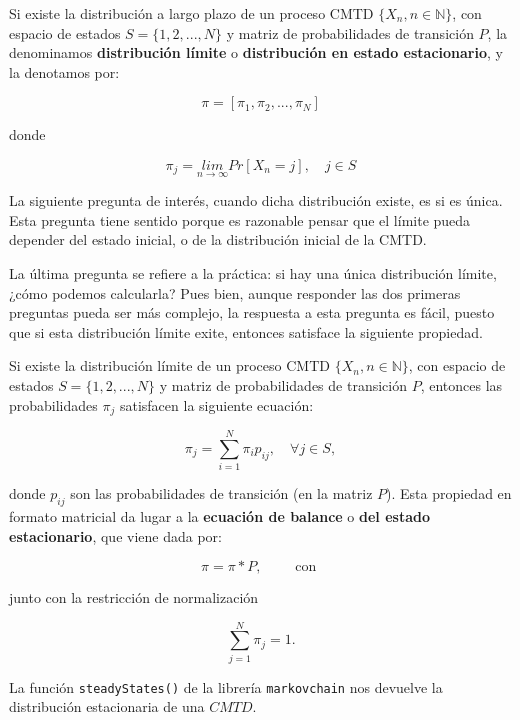 \documentclass[
]{book}
\newenvironment{yellowbox}{
  \definecolor{shadecolor}{rgb}{210, 180, 140}  
  \color{black}
  \begin{shaded}}
 {\end{shaded}}
\newenvironment{whitebox}{
  \definecolor{shadecolor}{rgb}{255, 255, 255}  
  \color{black}
  \begin{shaded}}
 {\end{shaded}}
\theoremstyle{definition}
\theoremstyle{definition}
\theoremstyle{definition}
\theoremstyle{definition}
\theoremstyle{remark}
\begin{document}
\begin{yellowbox}

Si existe la distribución a largo plazo de un proceso CMTD \(\{X_n, n \in \mathbb{N}\}\), con espacio de estados \(S =\{1, 2,..., N\}\) y matriz de probabilidades de transición \(P\), la denominamos \textbf{distribución límite} o \textbf{distribución en estado estacionario}, y la denotamos por:

\[\pi = [\pi_1, \pi_2,...,\pi_N]\]

donde

\[\pi_j = \underset{n \rightarrow \infty}{lim} Pr[X_n = j], \quad j \in S\]

\end{yellowbox}

La siguiente pregunta de interés, cuando dicha distribución existe, es si es única. Esta pregunta tiene sentido porque es razonable pensar que el límite pueda depender del estado inicial, o de la distribución inicial de la CMTD.

La última pregunta se refiere a la práctica: si hay una única distribución límite, ¿cómo podemos calcularla? Pues bien, aunque responder las dos primeras preguntas pueda ser más complejo, la respuesta a esta pregunta es fácil, puesto que si esta distribución límite exite, entonces satisface la siguiente propiedad.

\begin{yellowbox}

Si existe la distribución límite de un proceso CMTD \(\{X_n, n \in \mathbb{N}\}\), con espacio de estados \(S =\{1, 2,..., N\}\) y matriz de probabilidades de transición \(P\), entonces las probabilidades \(\pi_j\) satisfacen la siguiente ecuación:

\[\pi_j = \sum_{i=1}^N \pi_i p_{ij}, \quad \forall j \in S,\]

donde \(p_{ij}\) son las probabilidades de transición (en la matriz \(P\)). Esta propiedad en formato matricial da lugar a la \textbf{ecuación de balance} o \textbf{del estado estacionario}, que viene dada por:

\begin{equation}
\pi = \pi*P, \qquad \text{ con } 
\label{eq:ecuee}
\end{equation}

junto con la restricción de normalización

\[\sum_{j=1}^N \pi_j = 1.\]

\end{yellowbox}

\begin{whitebox}
La función \texttt{steadyStates()} de la librería \texttt{markovchain} nos devuelve la distribución estacionaria de una \(CMTD\).

\end{whitebox}
\end{document}
